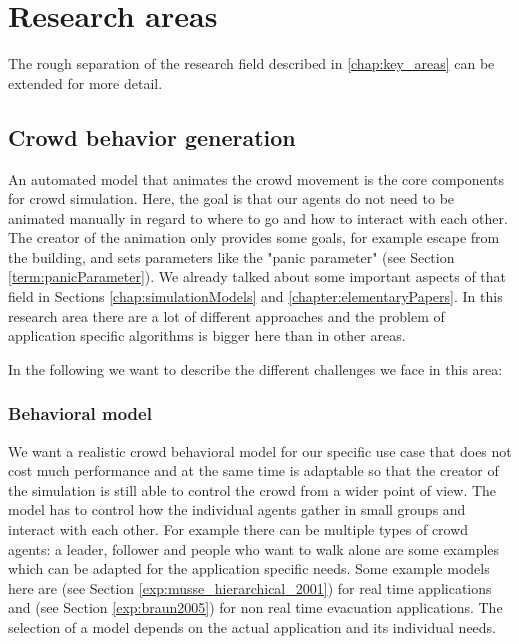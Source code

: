 \documentclass{acmsiggraph}               %
\begin{document}
\section{Research areas}
\label{chap:researchAreas}

The rough separation of the research field described in \ref{chap:key_areas} can be extended for more detail.

\subsection{Crowd behavior generation}

An automated model that animates the crowd movement is the core components for crowd simulation. Here, the goal is that our agents do not need to be animated manually in regard to where to go and how to interact with each other. The creator of the animation only provides some goals, for example escape from the building, and sets parameters like the "panic parameter" (see Section \ref{term:panicParameter}). We already talked about some important aspects of that field in Sections \ref{chap:simulationModels} and \ref{chapter:elementaryPapers}.  In this research area there are a lot of different approaches and the problem of application specific algorithms is bigger here than in other areas.

In the following we want to describe the different challenges we face in this area:

\subsubsection{Behavioral model}
We want a realistic crowd behavioral model for our specific use case that does not cost much performance and at the same time is adaptable so that the creator of the simulation is still able to control the crowd from a wider point of view. The model has to control how the individual agents gather in small groups and interact with each other. For example there can be multiple types of crowd agents: a leader, follower and people who want to walk alone are some examples which can be adapted for the application specific needs. Some example models here are \cite{musse_hierarchical_2001} (see Section \ref{exp:musse_hierarchical_2001}) for real time applications and \cite{braun_simulating_2005} (see Section \ref{exp:braun2005}) for non real time evacuation applications. The selection of a model depends on the actual application and its individual needs.
\end{document}
